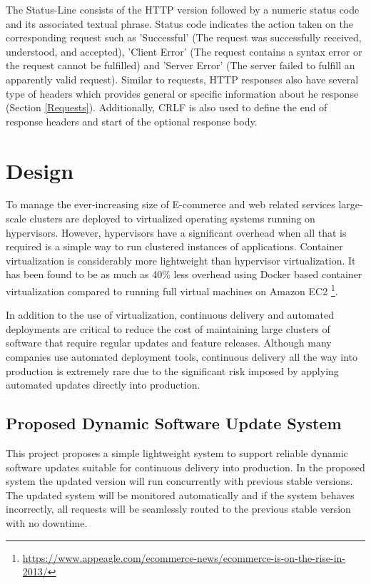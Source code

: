 \documentclass[a4paper,11pt,twoside]{article}
\begin{document}
The Status-Line consists of the HTTP version followed by a numeric status code and its associated textual phrase. Status code indicates the action taken on the corresponding request such as 'Successful' (The request was successfully received, understood, and accepted), 'Client Error' (The request contains a syntax error or the request cannot be fulfilled) and 'Server Error' (The server failed to fulfill an apparently valid request). Similar to requests, HTTP responses also have several type of headers which provides general or specific information about he response (Section \ref{Requests}). Additionally, CRLF is also used to define the end of response headers and start of the optional response body.   

 

\clearpage
\section{Design} \label{Design}
To manage the ever-increasing size of E-commerce and web related services large-scale clusters are deployed to virtualized operating systems running on hypervisors. However, hypervisors have a significant overhead when all that is required is a simple way to run clustered instances of applications. Container virtualization is considerably more lightweight than hypervisor virtualization. It has been found to be as much as 40\% less overhead using Docker based container virtualization compared to running full virtual machines on Amazon EC2 \footnote{\url{https://www.appeagle.com/ecommerce-news/ecommerce-is-on-the-rise-in-2013/}}.

In addition to the use of virtualization, continuous delivery and automated deployments are critical to reduce the cost of maintaining large clusters of software that require regular updates and feature releases. Although many companies use automated deployment tools, continuous delivery all the way into production is extremely rare due to the significant risk imposed by applying automated updates directly into production.

\subsection{Proposed Dynamic Software Update System}\label{modes} 
This project proposes a simple lightweight system to support reliable dynamic software updates suitable for continuous delivery into production. In the proposed system the updated version will run concurrently with previous stable versions. The updated system will be monitored automatically and if the system behaves incorrectly, all requests will be seamlessly routed to the previous stable version with no downtime.
\end{document}
